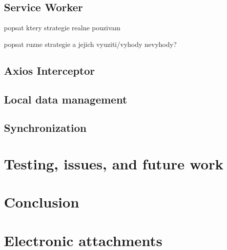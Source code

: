 \documentclass[
  digital,     %
  color,       %
  oneside,     %
  nosansbold,  %
  nocolorbold, %
  lof,         %
  lot,         %
]{fithesis4}
\begin{document}
\section{Service Worker}
popsat ktery strategie realne pouzivam

popsat ruzne strategie a jejich vyuziti/vyhody nevyhody?
\section{Axios Interceptor}
\section{Local data management}
\section{Synchronization}

\chapter{Testing, issues, and future work}

\chapter*{Conclusion}

\setcounter{biburllcpenalty}{7000}
\setcounter{biburlucpenalty}{8000}
\printbibliography[heading=bibintoc] %

\appendix %
\chapter{Electronic attachments}
\end{document}
